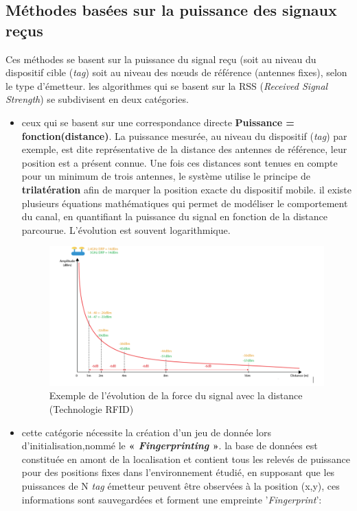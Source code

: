 \documentclass[12pt,a4paper]{report}
\begin{document}
\subsection{Méthodes basées sur la puissance des signaux reçus}

Ces méthodes se basent sur la puissance du signal reçu (soit au niveau du dispositif cible (\textit{tag}) soit au niveau des nœuds de référence (antennes fixes), selon le type d'émetteur. les algorithmes qui se basent sur la RSS (\textit{Received Signal Strength}) se subdivisent en deux catégories.
\begin{itemize}

\item ceux qui se basent sur une correspondance directe\textbf{ Puissance = fonction(distance)}. La puissance mesurée, au niveau du dispositif (\textit{tag}) par exemple, est dite représentative de la distance des antennes de référence, leur position est a présent connue.
Une fois ces distances sont tenues en compte pour un minimum de trois antennes, le système utilise le principe de \textbf{trilatération} afin de marquer la position exacte du dispositif mobile. il existe plusieurs équations mathématiques qui permet de modéliser le comportement du canal, en quantifiant la puissance du signal en fonction de la distance parcourue. L’évolution est souvent logarithmique.

\begin{figure}[H]
	\centering
	\includegraphics[width=1.1\linewidth]{Pics/rss.PNG}
	\caption{Exemple de l’évolution de la force du signal avec la distance (Technologie RFID)}
	\label{fig:rssi}
\end{figure}

\item
cette catégorie nécessite la création d’un jeu de donnée lors d’initialisation,nommé le \textbf{« \textit{Fingerprinting} »}. la base de données est constituée en amont de la localisation et contient tous les relevés de puissance pour des positions fixes dans l'environnement étudié, en supposant que les puissances de N \textit{tag} émetteur peuvent être observées à la position (x,y), ces informations sont sauvegardées et forment une empreinte '\textit{Fingerprint}':
 

\end{itemize}
\end{document}
